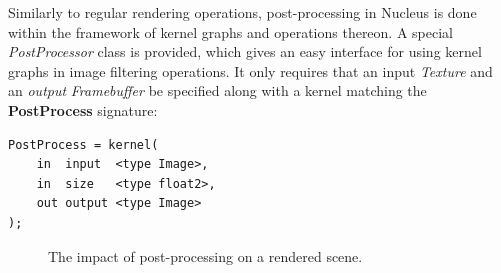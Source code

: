 Similarly to regular rendering operations, post-processing in Nucleus is done within the framework of kernel graphs and operations thereon. A special \emph{PostProcessor} class is provided, which gives an easy interface for using kernel graphs in image filtering operations. It only requires that an input \emph{Texture} and an \emph{output} \emph{Framebuffer} be specified along with a kernel matching the \textbf{PostProcess} signature:

\noindent\begin{minipage}{\textwidth}
\begin{lstlisting}[frame=single]
PostProcess = kernel(
    in  input  <type Image>,
    in  size   <type float2>,
    out output <type Image>
);
\end{lstlisting}
\end{minipage}

\begin{figure}[ht!]
  \centering
  \caption[The impact of post-processing]{The impact of post-processing on a rendered scene.}
\label{fig:lppFalloffBetterCase}
\end{figure}

